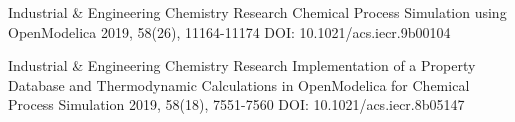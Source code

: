 

\begin{cventries}

  \cventry
    {Industrial \& Engineering Chemistry Research} %
    {Chemical Process Simulation using OpenModelica} %
    {2019, 58(26), 11164-11174} %
    {DOI: 10.1021/acs.iecr.9b00104} %
    {
    }

  \cventry
    {Industrial \& Engineering Chemistry Research} %
    {Implementation of a Property Database and Thermodynamic Calculations in OpenModelica for Chemical Process Simulation} %
    {2019, 58(18), 7551-7560} %
    {DOI: 10.1021/acs.iecr.8b05147} %
    {
    }

\end{cventries}


